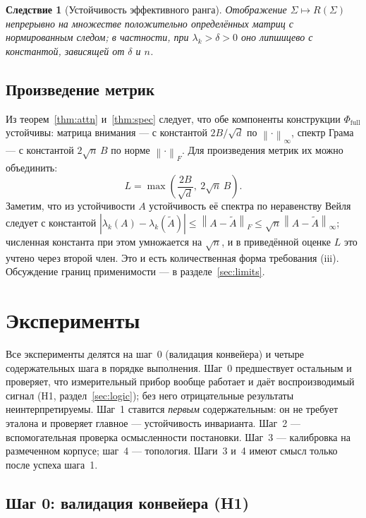 \documentclass[11pt,a4paper]{article}
\theoremstyle{definition}
\theoremstyle{plain}
\newtheorem{corollary}[definition]{Следствие}
\newcommand{\norm}[1]{\left\lVert #1 \right\rVert}
\newcommand{\abs}[1]{\left\lvert #1 \right\rvert}
\begin{document}
\begin{corollary}[Устойчивость эффективного ранга]
Отображение $\Sigma\mapsto R(\Sigma)$ непрерывно на множестве положительно определённых
матриц с нормированным следом; в частности, при $\lambda_k>\delta>0$ оно липшицево с константой,
зависящей от $\delta$ и $n$.
\end{corollary}

\subsection{Произведение метрик}

Из теорем~\ref{thm:attn} и~\ref{thm:spec} следует, что обе компоненты конструкции
$\Phi_{\mathrm{full}}$ устойчивы: матрица внимания — с константой $2B/\sqrt d$ по
$\norm{\cdot}_\infty$, спектр Грама — с константой $2\sqrt n\,B$ по норме
$\norm{\cdot}_F$. Для произведения метрик их можно объединить:
\[
L=\max\!\left(\frac{2B}{\sqrt d},\ 2\sqrt n\,B\right).
\]
Заметим, что из устойчивости $A$ устойчивость её спектра по неравенству Вейля следует с
константой $\abs{\lambda_k(A)-\lambda_k(\tilde A)}\le\norm{A-\tilde A}_F\le\sqrt n\norm{A-\tilde A}_\infty$;
численная константа при этом умножается на $\sqrt n$, и в приведённой оценке $L$ это учтено
через второй член. Это и есть количественная форма требования (iii). Обсуждение границ
применимости — в разделе~\ref{sec:limits}.

\section{Эксперименты}\label{sec:experiments}

Все эксперименты делятся на шаг~0 (валидация конвейера) и четыре содержательных шага в порядке
выполнения. Шаг~0 предшествует остальным и проверяет, что измерительный прибор вообще работает и
даёт воспроизводимый сигнал (H1, раздел~\ref{sec:logic}); без него отрицательные результаты
неинтерпретируемы. Шаг~1 ставится \emph{первым} содержательным: он не требует эталона и
проверяет главное — устойчивость инварианта. Шаг~2 — вспомогательная проверка осмысленности
постановки. Шаг~3 — калибровка на размеченном корпусе; шаг~4 — топология. Шаги~3 и~4 имеют смысл
только после успеха шага~1.

\subsection{Шаг 0: валидация конвейера (H1)}\label{sec:h1}
\end{document}
